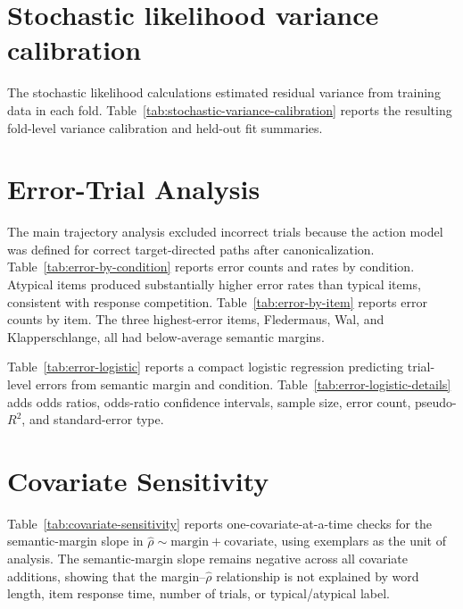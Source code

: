 \documentclass[11pt,final]{article}
\begin{document}


\section{Stochastic likelihood variance calibration}
\label{sec:supp-variance-calibration}

The stochastic likelihood calculations estimated residual variance from training data in each fold. Table~\ref{tab:stochastic-variance-calibration} reports the resulting fold-level variance calibration and held-out fit summaries.



\section{Error-Trial Analysis}
\label{sec:supp-error}

The main trajectory analysis excluded incorrect trials because the action model was defined for correct target-directed paths after canonicalization. Table~\ref{tab:error-by-condition} reports error counts and rates by condition. Atypical items produced substantially higher error rates than typical items, consistent with response competition. Table~\ref{tab:error-by-item} reports error counts by item. The three highest-error items, Fledermaus, Wal, and Klapperschlange, all had below-average semantic margins.





Table~\ref{tab:error-logistic} reports a compact logistic regression predicting trial-level errors from semantic margin and condition. Table~\ref{tab:error-logistic-details} adds odds ratios, odds-ratio confidence intervals, sample size, error count, pseudo-$R^2$, and standard-error type.





\section{Covariate Sensitivity}
\label{sec:supp-covariate}

Table~\ref{tab:covariate-sensitivity} reports one-covariate-at-a-time checks for the semantic-margin slope in $\hat{\rho} \sim \mathrm{margin} + \mathrm{covariate}$, using exemplars as the unit of analysis. The semantic-margin slope remains negative across all covariate additions, showing that the margin--$\hat{\rho}$ relationship is not explained by word length, item response time, number of trials, or typical/atypical label.
\end{document}
